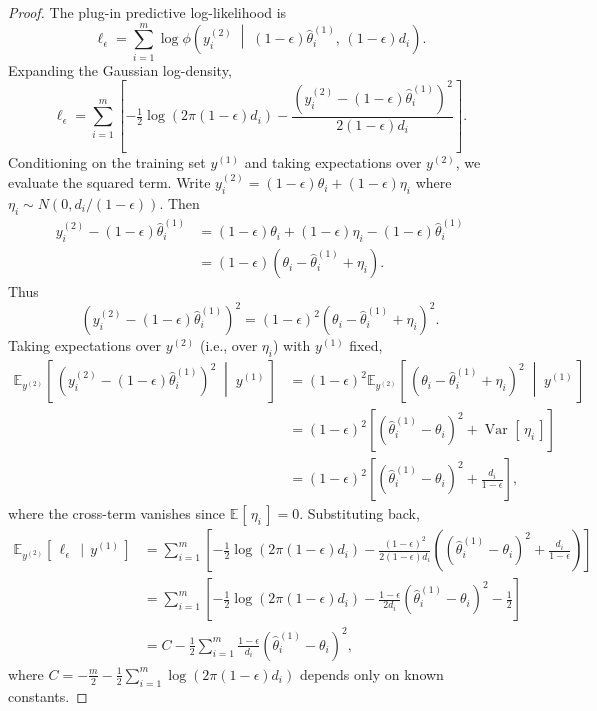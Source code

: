\documentclass[11pt]{article}
\newcommand{\given}{\,\mid\,}
\newcommand{\agiven}{\;\middle|\;}  %
\newcommand{\thetatrain}{\hat{\theta}^{(1)}}           %
\newcommand{\ytrain}{y^{(1)}}                           %
\newcommand{\ytest}{y^{(2)}}                            %
\newcommand{\E}[2][]{\mathbb{E}_{#1}\!\left[\,#2\,\right]}
\newcommand{\Var}[2][]{\operatorname{Var}_{#1}\!\left[\,#2\,\right]}
\newcommand{\N}[2]{N\!\left(#1, #2\right)}
\theoremstyle{plain}
\theoremstyle{definition}
\theoremstyle{remark}
\begin{document}
\begin{proof}
The plug-in predictive log-likelihood is
\[
\ell_{\epsilon} = \sum_{i=1}^m \log \phi\!\left( \ytest_i \agiven (1-\epsilon)\thetatrain_i,\, (1-\epsilon)d_i \right).
\]
Expanding the Gaussian log-density,
\[
\ell_{\epsilon} = \sum_{i=1}^m \left[ -\tfrac{1}{2}\log(2\pi(1-\epsilon)d_i) - \frac{(\ytest_i - (1-\epsilon)\thetatrain_i)^2}{2(1-\epsilon)d_i} \right].
\]
Conditioning on the training set $\ytrain$ and taking expectations over $\ytest$, we evaluate the squared term. Write $\ytest_i = (1-\epsilon)\theta_i + (1-\epsilon)\eta_i$ where $\eta_i \sim \N{0}{d_i/(1-\epsilon)}$. Then
\begin{align*}
\ytest_i - (1-\epsilon)\thetatrain_i
&= (1-\epsilon)\theta_i + (1-\epsilon)\eta_i - (1-\epsilon)\thetatrain_i \\
&= (1-\epsilon)\left( \theta_i - \thetatrain_i + \eta_i \right).
\end{align*}
Thus
\[
\left( \ytest_i - (1-\epsilon)\thetatrain_i \right)^2 = (1-\epsilon)^2 \left( \theta_i - \thetatrain_i + \eta_i \right)^2.
\]
Taking expectations over $\ytest$ (i.e., over $\eta_i$) with $\ytrain$ fixed,
\begin{align*}
\E[\ytest]{\left( \ytest_i - (1-\epsilon)\thetatrain_i \right)^2 \agiven \ytrain}
&= (1-\epsilon)^2 \E[\ytest]{\left( \theta_i - \thetatrain_i + \eta_i \right)^2 \agiven \ytrain} \\
&= (1-\epsilon)^2 \left[ \left( \thetatrain_i - \theta_i \right)^2 + \Var{\eta_i} \right] \\
&= (1-\epsilon)^2 \left[ \left( \thetatrain_i - \theta_i \right)^2 + \tfrac{d_i}{1-\epsilon} \right],
\end{align*}
where the cross-term vanishes since $\E{\eta_i} = 0$. Substituting back,
\begin{align*}
\E[\ytest]{\ell_{\epsilon} \given \ytrain}
&= \sum_{i=1}^m \left[ -\tfrac{1}{2}\log(2\pi(1-\epsilon)d_i) - \frac{(1-\epsilon)^2}{2(1-\epsilon)d_i} \left( \left( \thetatrain_i - \theta_i \right)^2 + \tfrac{d_i}{1-\epsilon} \right) \right] \\
&= \sum_{i=1}^m \left[ -\tfrac{1}{2}\log(2\pi(1-\epsilon)d_i) - \tfrac{1-\epsilon}{2d_i} \left( \thetatrain_i - \theta_i \right)^2 - \tfrac{1}{2} \right] \\
&= C - \frac{1}{2}\sum_{i=1}^m \frac{1-\epsilon}{d_i} \left( \thetatrain_i - \theta_i \right)^2,
\end{align*}
where $C = -\tfrac{m}{2} - \tfrac{1}{2}\sum_{i=1}^m \log(2\pi(1-\epsilon)d_i)$ depends only on known constants.
\end{proof}
\end{document}
